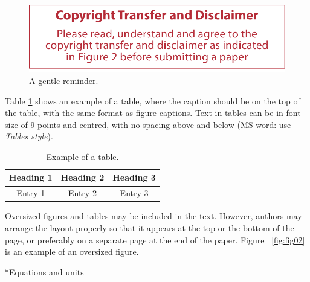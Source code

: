 \documentclass[twocolumn, a4paper,10pt]{article}
\makeatletter
\renewcommand\subsection{\@startsection{subsection}{1}{\z@}{\z@}{\z@}{\normalfont\normalsize\bfseries}}
\renewcommand\subsection{\@startsection{subsection}{1}{\z@}{\z@}{0.1pt}{\normalfont\normalsize\bfseries}}
\makeatother
\begin{document}
\begin{figure}
\centering
  \includegraphics[width=\linewidth]{img/fig1}
  \caption{A gentle reminder.}
  \label{fig:fig01}
\vspace{-16pt}   %
\end{figure}

Table \ref{tab:tab01} shows an example of a table, where the caption should be on the top of the table, with the same format as figure captions. Text in tables can be in font size of 9 points and centred, with no spacing above and below (MS-word: use \textit{Tables style}).

\begin{table}[ht]
\vspace{-5pt}   %
\caption{Example of a table.}
\label{tab:tab01}
\centering
\begin{tabular}{| c | c | c | }
  \hline
  \bf{Heading 1} & \bf{Heading} 2 & \bf{Heading 3} \\
  \hline
  Entry 1 & Entry 2 & Entry 3 \\
  \hline
\end{tabular}
\vspace{-5pt}   %
\end{table}

Oversized figures and tables may be included in the text. However, authors may arrange the layout properly so that it appears at the top or the bottom of the page, or preferably on a separate page at the end of the paper. Figure ~\ref{fig:fig02} is an example of an oversized figure.

\subsection*{Equations and units}
\end{document}
